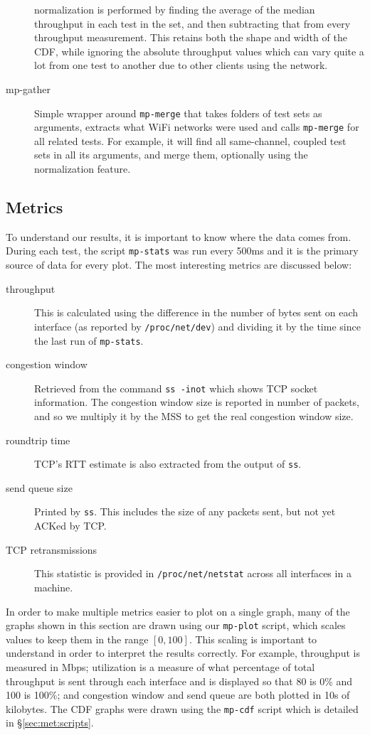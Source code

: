 \begin{description}
    normalization is performed by finding the average of the median throughput
    in each test in the set, and then subtracting that from every throughput
    measurement. This retains both the shape and width of the CDF, while
    ignoring the absolute throughput values which can vary quite a lot from one
    test to another due to other clients using the network.
  \item[mp-gather]
    Simple wrapper around \texttt{mp-merge} that takes folders of test sets as
    arguments, extracts what WiFi networks were used and calls \texttt{mp-merge}
    for all related tests. For example, it will find all same-channel, coupled
    test sets in all its arguments, and merge them, optionally using the
    normalization feature.
\end{description}

\subsection{Metrics}
\label{sec:met:metrics}
To understand our results, it is important to know where the data comes from.
During each test, the script \texttt{mp-stats} was run every 500ms and it is the
primary source of data for every plot. The most interesting metrics are
discussed below:

\begin{description}
  \item[throughput]
    This is calculated using the difference in the number of bytes sent on each
    interface (as reported by \texttt{/proc\-/net/\-dev}) and dividing it by the
    time since the last run of \texttt{mp-stats}.
  \item[congestion window]
    Retrieved from the command \texttt{ss -inot} which shows TCP socket
    information. The congestion window size is reported in number of packets,
    and so we multiply it by the MSS to get the real congestion window size.
  \item[roundtrip time]
    TCP's RTT estimate is also extracted from the output of \texttt{ss}.
  \item[send queue size]
    Printed by \texttt{ss}. This includes the size of any packets sent, but not
    yet ACKed by TCP.
  \item[TCP retransmissions]
    This statistic is provided in \texttt{/proc\-/net/\-netstat} across all
    interfaces in a machine.
\end{description}

In order to make multiple metrics easier to plot on a single graph, many of the
graphs shown in this section are drawn using our \texttt{mp-plot} script, which
scales values to keep them in the range $[0,100]$. This scaling is important to
understand in order to interpret the results correctly. For example, throughput
is measured in Mbps; utilization is a measure of what percentage of total
throughput is sent through each interface and is displayed so that 80 is 0\% and
100 is 100\%; and congestion window and send queue are both plotted in 10s of
kilobytes. The CDF graphs were drawn using the \texttt{mp-cdf} script which is
detailed in \S\ref{sec:met:scripts}.
